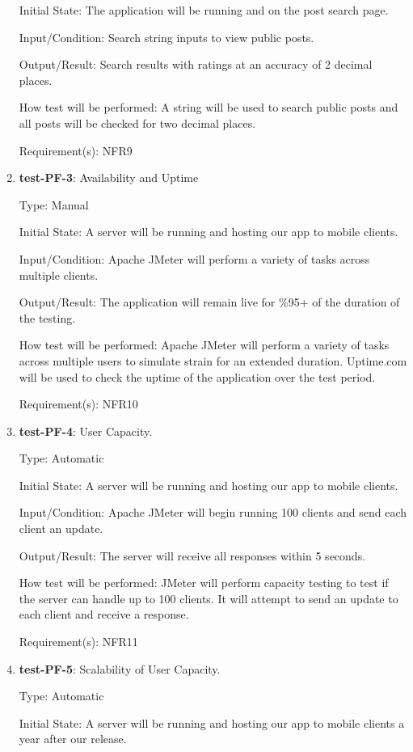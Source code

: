\documentclass[12pt, titlepage]{article}
\begin{document}
\begin{enumerate}
		Initial State: The application will be running and on the post search page.
		
		Input/Condition: Search string inputs to view public posts.
		
		Output/Result: Search results with ratings at an accuracy of 2 decimal places.
		
		How test will be performed: A string will be used to search public posts and all posts will be checked for two decimal places.
		
		Requirement(s): NFR9
		
		\item{\textbf{test-PF-3}}: Availability and Uptime
		
		Type: Manual
		
		Initial State: A server will be running and hosting our app to mobile clients.
		
		Input/Condition: Apache JMeter will perform a variety of tasks across multiple clients.
		
		Output/Result: The application will remain live for \%95+ of the duration of the testing.
		
		How test will be performed: Apache JMeter will perform a variety of tasks across multiple users to simulate strain for an extended duration. Uptime.com will be used to check the uptime of the application over the test period.
		
		Requirement(s): NFR10
		
		\item{\textbf{test-PF-4}}: User Capacity.
		
		Type: Automatic
		
		Initial State: A server will be running and hosting our app to mobile clients.
		
		Input/Condition: Apache JMeter will begin running 100 clients and send each client an update.
		
		Output/Result: The server will receive all responses within 5 seconds.
		
		How test will be performed: JMeter will perform capacity testing to test if the server can handle up to 100 clients. It will attempt to send an update to each client and receive a response.
		
		Requirement(s): NFR11
		
		\item{\textbf{test-PF-5}}: Scalability of User Capacity.
		
		Type: Automatic
		
		Initial State: A server will be running and hosting our app to mobile clients a year after our release.
		

\end{enumerate}
\end{document}
